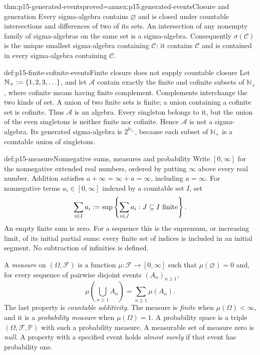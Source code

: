 \begin{hbtheorem}{thm:p15-generated-events}{proved=annex:p15.generated-events}{Closure and generation}
Every sigma-algebra contains \(\varnothing\) and is closed under
countable intersections and differences of two of its sets. An intersection
of any nonempty family of sigma-algebras on the same set is a sigma-algebra.
Consequently \(\sigma(\mathcal C)\) is the unique smallest sigma-algebra
containing \(\mathcal C\): it contains \(\mathcal C\) and is contained
in every sigma-algebra containing \(\mathcal C\).
\end{hbtheorem}

\begin{hbexample}{def:p15-finite-cofinite-events}{Finite closure does not supply countable closure}
Let \(\mathbb N_+\mathrel{:=}\{1,2,3,\ldots\}\), and let \(\mathcal A\)
contain exactly the finite and cofinite subsets of \(\mathbb N_+\),
where cofinite means having finite complement. Complements interchange
the two kinds of set. A union of two finite sets is finite; a union
containing a cofinite set is cofinite. Thus \(\mathcal A\) is an algebra.
Every singleton belongs to it, but the union of the even singletons is
neither finite nor cofinite. Hence \(\mathcal A\) is not a sigma-algebra.
Its generated sigma-algebra is \(2^{\mathbb N_+}\), because each subset
of \(\mathbb N_+\) is a countable union of singletons.
\end{hbexample}

\begin{hbdefinition}{def:p15-measure}{Nonnegative sums, measures and probability}
Write \([0,\infty]\) for the nonnegative extended real numbers, ordered
by putting \(\infty\) above every real number. Addition satisfies
\(a+\infty=\infty+a=\infty\), including \(a=\infty\).
For nonnegative terms \(a_i\in[0,\infty]\) indexed by a countable set
\(I\), set
\[
 \sum_{i\in I}a_i\mathrel{:=}
 \sup\left\{\sum_{i\in J}a_i:J\subseteq I\text{ finite}\right\}.
\]
An empty finite sum is zero. For a sequence this is the supremum, or
increasing limit, of its initial partial sums: every finite set of indices
is included in an initial segment. No subtraction of infinities is defined.

A \emph{measure} on \((\Omega,\mathcal F)\) is a function
\(\mu:\mathcal F\to[0,\infty]\) such that
\(\mu(\varnothing)=0\) and, for every sequence of pairwise disjoint
events \((A_n)_{n\geq1}\),
\[
 \mu\left(\bigcup_{n\geq1}A_n\right)=\sum_{n\geq1}\mu(A_n).
\]
The last property is \emph{countable additivity}. The measure is
\emph{finite} when \(\mu(\Omega)<\infty\), and it is a
\emph{probability measure} when \(\mu(\Omega)=1\). A probability
space is a triple \((\Omega,\mathcal F,\mathbb P)\) with such a
probability measure. A measurable set of measure zero is \emph{null}.
A property with a specified event holds \emph{almost surely} if that
event has probability one.
\end{hbdefinition}

